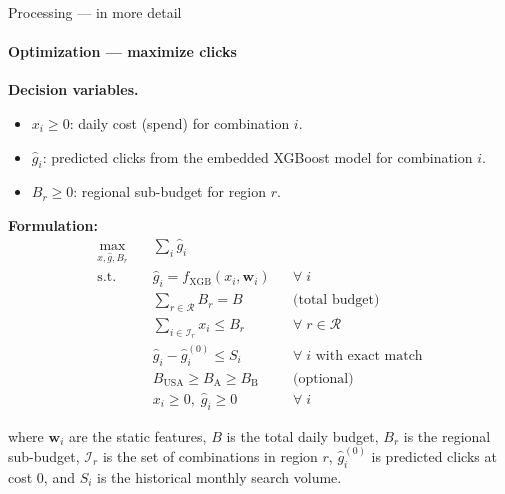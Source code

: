 \documentclass[smaller]{beamer}
\begin{document}
\begin{frame}{Processing --- in more detail}
\framesubtitle{Optimization --- maximize clicks}

\footnotesize

\textbf{Decision variables.}
\begin{itemize}
    \item $x_i \geq 0$: daily cost (spend) for combination $i$.
    \item $\hat{g}_i$: predicted clicks from the embedded XGBoost model for combination $i$.
    \item $B_r \geq 0$: regional sub-budget for region $r$.
\end{itemize}

\medskip
\textbf{Formulation:}
\begin{align*}
    \max_{x,\hat{g}, B_r} \quad & \sum_{i} \hat{g}_i \\
    \text{s.t.} \quad
    & \hat{g}_i = f_{\text{XGB}}(x_i, \mathbf{w}_i) && \forall\; i \\
    & \sum_{r \in \mathcal{R}} B_r = B && \text{(total budget)} \\
    & \sum_{i \in \mathcal{I}_r} x_i \leq B_r && \forall\; r \in \mathcal{R} \\
    & \hat{g}_i - \hat{g}_i^{(0)} \leq S_i && \forall\; i \text{ with exact match} \\
    & B_{\text{USA}} \geq B_{\text{A}} \geq B_{\text{B}} && \text{(optional)} \\
    & x_i \geq 0,\; \hat{g}_i \geq 0 && \forall\; i
\end{align*}

where $\mathbf{w}_i$ are the static features, $B$ is the total daily budget, $B_r$ is the regional sub-budget, $\mathcal{I}_r$ is the set of combinations in region $r$, $\hat{g}_i^{(0)}$ is predicted clicks at cost 0, and $S_i$ is the historical monthly search volume.

\end{frame}
\end{document}
